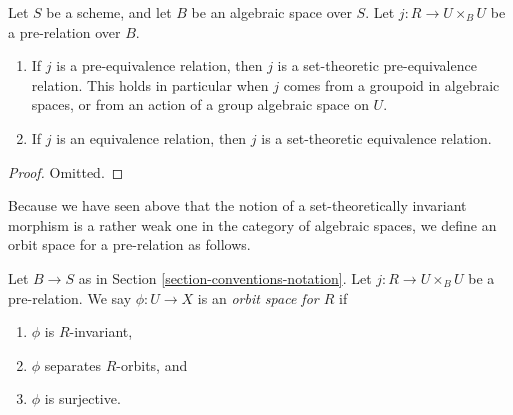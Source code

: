 \begin{lemma}
\label{lemma-set-theoretic-equivalence}
Let $S$ be a scheme, and let $B$ be an algebraic space over $S$.
Let $j : R \to U \times_B U$ be a pre-relation over $B$.
\begin{enumerate}
\item If $j$ is a pre-equivalence relation, then $j$ is a
set-theoretic pre-equivalence relation. This holds in particular
when $j$ comes from a groupoid in algebraic spaces, or from an
action of a group algebraic space on $U$.
\item If $j$ is an equivalence relation, then $j$ is a
set-theoretic equivalence relation.
\end{enumerate}
\end{lemma}

\begin{proof}
Omitted.
\end{proof}

\noindent
Because we have seen above that the notion of a set-theoretically
invariant morphism is a rather weak one in the category of algebraic
spaces, we define an orbit space for a pre-relation as follows.

\begin{definition}
\label{definition-orbit-space}
Let $B \to S$ as in Section \ref{section-conventions-notation}.
Let $j : R \to U \times_B U$ be a pre-relation.
We say $\phi : U \to X$ is an {\it orbit space for $R$} if
\begin{enumerate}
\item $\phi$ is $R$-invariant,
\item $\phi$ separates $R$-orbits, and
\item $\phi$ is surjective.
\end{enumerate}
\end{definition}









